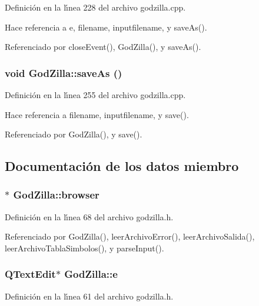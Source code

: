 Definici\'{o}n en la l\'{\i}nea 228 del archivo godzilla.cpp.

Hace referencia a e, filename, inputfilename, y save\-As().

Referenciado por close\-Event(), God\-Zilla(), y save\-As().
\subsubsection{\setlength{\rightskip}{0pt plus 5cm}void God\-Zilla::save\-As ()\hspace{0.3cm}{\tt  [private, slot]}}\label{classGodZilla_k8}




Definici\'{o}n en la l\'{\i}nea 255 del archivo godzilla.cpp.

Hace referencia a filename, inputfilename, y save().

Referenciado por God\-Zilla(), y save().

\subsection{Documentaci\'{o}n de los datos miembro}
\subsubsection{$\ast$ {\bf God\-Zilla::browser}\hspace{0.3cm}{\tt  [private]}}\label{classGodZilla_r8}




Definici\'{o}n en la l\'{\i}nea 68 del archivo godzilla.h.

Referenciado por God\-Zilla(), leer\-Archivo\-Error(), leer\-Archivo\-Salida(), leer\-Archivo\-Tabla\-Simbolos(), y parse\-Input().
\subsubsection{\setlength{\rightskip}{0pt plus 5cm}QText\-Edit$\ast$ {\bf God\-Zilla::e}\hspace{0.3cm}{\tt  [private]}}\label{classGodZilla_r1}




Definici\'{o}n en la l\'{\i}nea 61 del archivo godzilla.h.

